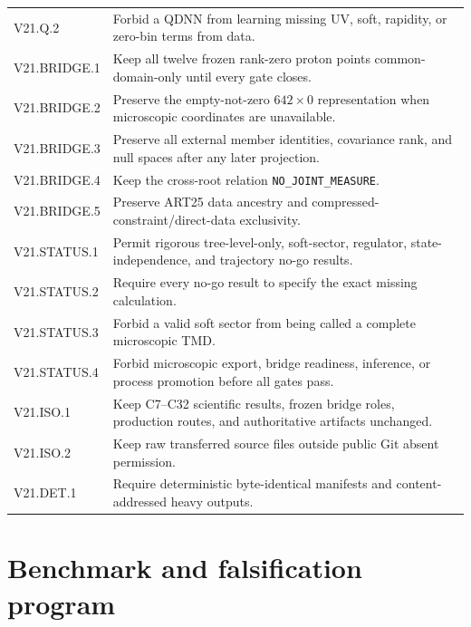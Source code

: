 \documentclass[11pt]{article}
\begin{document}
\begin{longtable}{L{0.19\textwidth}L{0.72\textwidth}}
V21.Q.2 & Forbid a QDNN from learning missing UV, soft, rapidity, or zero-bin terms from data.\\
V21.BRIDGE.1 & Keep all twelve frozen rank-zero proton points common-domain-only until every gate closes.\\
V21.BRIDGE.2 & Preserve the empty-not-zero \(642\times0\) representation when microscopic coordinates are unavailable.\\
V21.BRIDGE.3 & Preserve all external member identities, covariance rank, and null spaces after any later projection.\\
V21.BRIDGE.4 & Keep the cross-root relation \texttt{NO\_JOINT\_MEASURE}.\\
V21.BRIDGE.5 & Preserve ART25 data ancestry and compressed-constraint/direct-data exclusivity.\\
V21.STATUS.1 & Permit rigorous tree-level-only, soft-sector, regulator, state-independence, and trajectory no-go results.\\
V21.STATUS.2 & Require every no-go result to specify the exact missing calculation.\\
V21.STATUS.3 & Forbid a valid soft sector from being called a complete microscopic TMD.\\
V21.STATUS.4 & Forbid microscopic export, bridge readiness, inference, or process promotion before all gates pass.\\
V21.ISO.1 & Keep C7--C32 scientific results, frozen bridge roles, production routes, and authoritative artifacts unchanged.\\
V21.ISO.2 & Keep raw transferred source files outside public Git absent permission.\\
V21.DET.1 & Require deterministic byte-identical manifests and content-addressed heavy outputs.\\
\bottomrule
\end{longtable}

\section{Benchmark and falsification program}
\label{sec:benchmarks}
\end{document}
